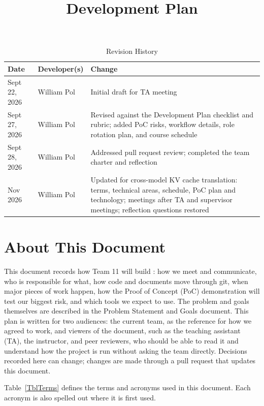\documentclass{article}
\title{Development Plan\\\progname}
\author{\authname}
\date{}
\begin{document}
\maketitle

\begin{table}[hp]
\caption{Revision History} \label{TblRevisionHistory}
\begin{tabularx}{\textwidth}{llX}
\toprule
\textbf{Date} & \textbf{Developer(s)} & \textbf{Change}\\
\midrule
Sept 22, 2026 & William Pol & Initial draft for TA meeting\\
Sept 27, 2026 & William Pol & Revised against the Development Plan checklist
and rubric; added PoC risks, workflow details, role rotation plan, and
course schedule\\
Sept 28, 2026 & William Pol & Addressed pull request review; completed
the team charter and reflection\\
Nov 2026 & William Pol & Updated for cross-model KV cache translation:
terms, technical areas, schedule, PoC plan and technology; meetings after
TA and supervisor meetings; reflection questions restored\\
\bottomrule
\end{tabularx}
\end{table}

\newpage{}

\section*{About This Document}

This document records how Team 11 will build \progname{}: how we meet and
communicate, who is responsible for what, how code and documents move
through git, when major pieces of work happen, how the Proof of Concept
(PoC) demonstration will test our biggest risk, and which tools we expect
to use. The problem and goals themselves are described in the Problem
Statement and Goals document. This plan is written for two audiences: the
current team, as the reference for how we agreed to work, and viewers of
the document, such as the teaching assistant (TA), the instructor, and
peer reviewers, who
should be able to read it and understand how the project is run without
asking the team directly. Decisions recorded here can change; changes are
made through a pull request that updates this document.

Table~\ref{TblTerms} defines the terms and acronyms used in this
document. Each acronym is also spelled out where it is first used.
\end{document}
